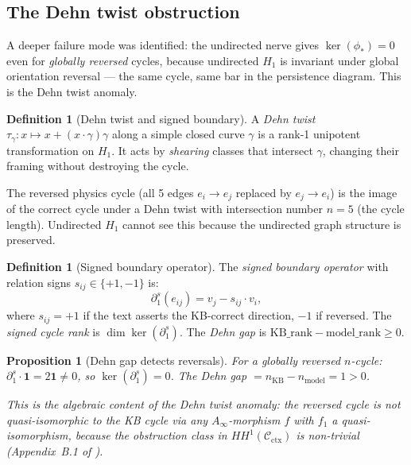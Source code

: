 \documentclass[11pt]{amsart}
\newtheorem{proposition}[theorem]{Proposition}
\theoremstyle{definition}
\newtheorem{definition}[theorem]{Definition}
\newcommand{\Cctx}{\mathcal{C}_{\!\mathrm{ctx}}}
\begin{document}
\subsection{The Dehn twist obstruction}

A deeper failure mode was identified: the undirected nerve gives
$\ker(\phi_*) = 0$ even for \emph{globally reversed} cycles, because
undirected $H_1$ is invariant under global orientation reversal ---
the same cycle, same bar in the persistence diagram.
This is the Dehn twist anomaly.

\begin{definition}[Dehn twist and signed boundary]
A \emph{Dehn twist} $\tau_\gamma: x \mapsto x + (x \cdot \gamma)\gamma$
along a simple closed curve $\gamma$ is a rank-1 unipotent transformation
on $H_1$.
It acts by \emph{shearing} classes that intersect $\gamma$, changing
their framing without destroying the cycle.

The reversed physics cycle (all 5 edges $e_i \to e_j$ replaced by
$e_j \to e_i$) is the image of the correct cycle under a Dehn twist
with intersection number $n = 5$ (the cycle length).
Undirected $H_1$ cannot see this because the undirected graph structure
is preserved.
\end{definition}

\begin{definition}[Signed boundary operator]
\label{def:signed-bdry}
The \emph{signed boundary operator} with relation signs
$s_{ij} \in \{+1, -1\}$ is:
\[
  \partial_1^s(e_{ij}) = v_j - s_{ij} \cdot v_i,
\]
where $s_{ij} = +1$ if the text asserts the KB-correct direction,
$-1$ if reversed.
The \emph{signed cycle rank} is $\dim \ker(\partial_1^s)$.
The \emph{Dehn gap} is $\mathrm{KB\_rank} - \mathrm{model\_rank} \geq 0$.
\end{definition}

\begin{proposition}[Dehn gap detects reversals]
\label{prop:dehn}
For a globally reversed $n$-cycle: $\partial_1^s \cdot \mathbf{1} = 2\mathbf{1} \neq 0$,
so $\ker(\partial_1^s) = 0$.
The Dehn gap $= n_{\mathrm{KB}} - n_{\mathrm{model}} = 1 > 0$.

This is the algebraic content of the Dehn twist anomaly:
the reversed cycle is \emph{not quasi-isomorphic} to the KB cycle
via any $A_\infty$-morphism $f$ with $f_1$ a quasi-isomorphism,
because the obstruction class in $HH^1(\Cctx)$ is non-trivial
(Appendix~B.1 of \cite{LFH03}).
\end{proposition}
\end{document}
